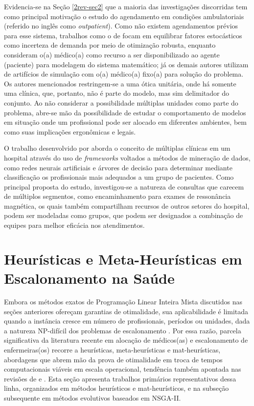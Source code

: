 Evidencia-se na Seção \ref{2rev-sec2} que  a maioria das investigações discorridas tem como principal motivação o estudo do agendamento em condições ambulatoriais (referido no inglês como \textit{outpatient}). Como não existem agendamentos prévios para esse sistema, trabalhos como o de  focam em equilibrar fatores estocásticos como incerteza de demanda por meio de otimização robusta, enquanto  consideram o(a) médico(a) como recurso a ser disponibilizado ao agente (paciente) para modelagem do sistema matemático; já os demais autores utilizam de artifícios de simulação com o(a) médico(a) fixo(a) para solução do problema. Os autores mencionados restringem-se a uma ótica unitária, onde há somente uma clínica, que, portanto, não é parte do modelo, mas sim delimitador do conjunto. Ao não considerar a possibilidade múltiplas unidades como parte do problema, abre-se mão da possibilidade de estudar o comportamento de modelos em situação onde um profissional pode ser alocado em diferentes ambientes, bem como suas implicações ergonômicas e legais.

O trabalho desenvolvido por  aborda o conceito de múltiplas clínicas em um hospital através do uso de \textit{frameworks} voltados a métodos de mineração de dados, como redes neurais artificiais e árvores de decisão para determinar mediante classificação os profissionais mais adequados a um grupo de pacientes. Como principal proposta do estudo, investigou-se a natureza de consultas que carecem de múltiplos segmentos, como encaminhamento para exames de ressonância magnética, os quais também compartilham recursos de outros setores do hospital, podem ser modeladas como grupos, que podem ser designados a combinação de equipes para melhor eficácia nos atendimentos.

\section{Heurísticas e Meta-Heurísticas em Escalonamento na Saúde}
\label{2rev-sec3}

Embora os métodos exatos de Programação Linear Inteira Mista discutidos nas seções anteriores ofereçam garantias de otimalidade, sua aplicabilidade é limitada quando a instância cresce em número de profissionais, períodos ou unidades, dada a natureza NP-difícil dos problemas de escalonamento \cite{Even_Itai_Shamir_1976}. Por essa razão, parcela significativa da literatura recente em alocação de médicos(as) e escalonamento de enfermeiras(os) recorre a heurísticas, meta-heurísticas e mat-heurísticas, abordagens que abrem mão da prova de otimalidade em troca de tempos computacionais viáveis em escala operacional, tendência também apontada nas revisões de  e . Esta seção apresenta trabalhos primários representativos dessa linha, organizados em métodos heurísticos e mat-heurísticos, e na subseção subsequente em métodos evolutivos baseados em NSGA-II.


